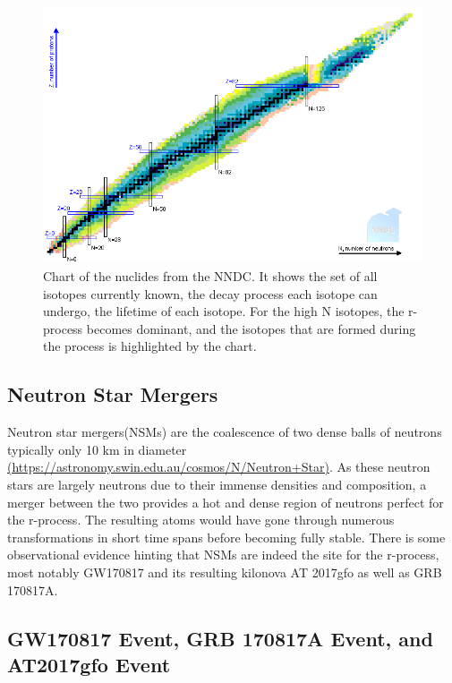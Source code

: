 \documentclass[11pt,a4paper]{article}
\begin{document}
\begin{figure}[h!]
  \includegraphics[width=1\textwidth , scale = .5]{nuclides_chart.png}
  \caption{Chart of the nuclides from the NNDC. It shows the set of all isotopes currently known, the decay process each isotope can undergo, the lifetime of each isotope. For the high N isotopes, the r-process becomes dominant, and the isotopes that are formed during the process is highlighted by the chart.}
\end{figure}

\subsection{Neutron Star Mergers}

Neutron star mergers(NSMs) are the coalescence of two dense balls of neutrons typically only 10 km in diameter \url{(https://astronomy.swin.edu.au/cosmos/N/Neutron+Star)}. As these neutron stars are largely neutrons due to their immense densities and composition, a merger between the two provides a hot and dense region of neutrons perfect for the r-process. The resulting atoms would have gone through numerous transformations in short time spans before becoming fully stable. There is some observational evidence hinting that NSMs are indeed the site for the r-process, most notably GW170817 and its resulting kilonova AT 2017gfo as well as GRB 170817A. 

\subsection{GW170817 Event, GRB 170817A Event, and AT2017gfo Event}
\end{document}
